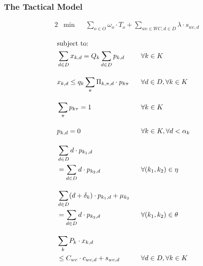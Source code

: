 \documentclass[runningheads]{llncs}
\begin{document}
\subsubsection{The Tactical Model}

\begin{alignat}{2} 
& \min && \sum_{o \in O} \omega_o \cdot T_o + \sum_{wc \in WC, d \in D} \lambda \cdot s_{wc,d} \label{eqn:tactical_objective}
\end{alignat}

\begin{alignat}{2}
    &\text{subject to:}\notag \\
    &\sum_{d \in D} x_{k,d} = Q_k \sum_{d \in D} p_{k,d}                                        \ \ && \forall k \in K                              \label{eqn:tactical_complete_work}  \\[1em]
    &x_{k,d} \leq q_k \sum_{\pi} \Pi_{k, \pi, d} \cdot p_{k\pi}                                 \ \ && \forall d \in D, \forall k \in K             \label{eqn:tactical_operating_time} \\[1em]
    &\sum_{\pi} p_{k\tau} = 1                                                                   \ \ && \forall k \in K                              \label{eqn:tactical_one_pattern}    \\[1em]
    &p_{k,d} = 0                                                                                \ \ && \forall k \in K, \forall d < \alpha_k        \label{eqn:tactical_earliest_starting_time} \\[1em]
    &\sum_{d \in D} d \cdot p_{k_1,d}                                                           \ \ && \notag \\
    & = \sum_{d \in D} d \cdot p_{k_2,d}                                                        \ \ && \forall (k_1, k_2) \in \eta                  \label{eqn:tactical_start_start}    \\[1em]
    &\sum_{d \in D} (d + \delta_k) \cdot p_{k_1,d} + \mu_{k_2}                                  \ \ && \notag \\
    & = \sum_{d \in D} d \cdot p_{k_2,d}                                                        \ \ && \forall (k_1, k_2) \in \theta                \label{eqn:tactical_finish_start} \\[1em]
    &\sum_{k} P_k \cdot x_{k,d}                                                                 \ \ && \notag \\
    & \leq C_{wc} \cdot c_{wc,d} + s_{wc,d}                                                     \ \ && \forall d \in D, \forall k \in K             \label{eqn:tactical_capacity} \\[1em]

\end{alignat}
\end{document}

